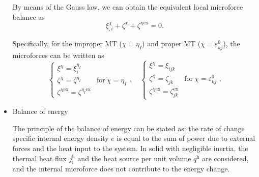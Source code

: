\documentclass[reprint,3p,sort&compress,times,onecolumn]{elsarticle}
\begin{document}
\begin{itemize}
By means of the Gauss law, we can obtain the equivalent local microforce balance as
\begin{equation}
\xi^{\chi}_{,i}+\zeta^{\chi}+\zeta^{\chi \text{ex}}=0 . \label{eq-balance-mircoforce}
\end{equation}

Specifically, for the improper MT ($\chi=\eta_I$) and proper MT ($\chi=\varepsilon_{kj}^0$), the microforces can be written as~\cite{Landis2008A} 
\begin{equation}
\begin{cases}
\xi^{\chi} =\xi^{\eta_I}_i  & ~\\
\zeta^{\chi}= \zeta^{\eta_I} & \text{for} ~ \chi=\eta_I \\
\zeta^{\chi \text{ex}}= \zeta^{\eta_I \text{ex}}&~
\end{cases}, \quad
\begin{cases}
\xi^{\chi} =\xi_{ijk}  & ~\\
\zeta^{\chi}= \zeta_{jk} & \text{for} ~ \chi=\varepsilon_{kj}^0 \\
\zeta^{\chi \text{ex}}= \zeta^\text{ex}_{jk} &~
\end{cases}.
\end{equation}


\item Balance of energy
  
The principle of the balance of energy can be stated as: the rate of change specific internal energy density $e$ is equal to the sum of power due to external forces and the heat input to the system. In solid with negligible inertia, the thermal heat flux $j_i^{\text{h}}$ and the heat source per unit volume $q^{\text{h}}$ are considered, and the internal microforce does not contribute to the energy change.


\end{itemize}
\end{document}
